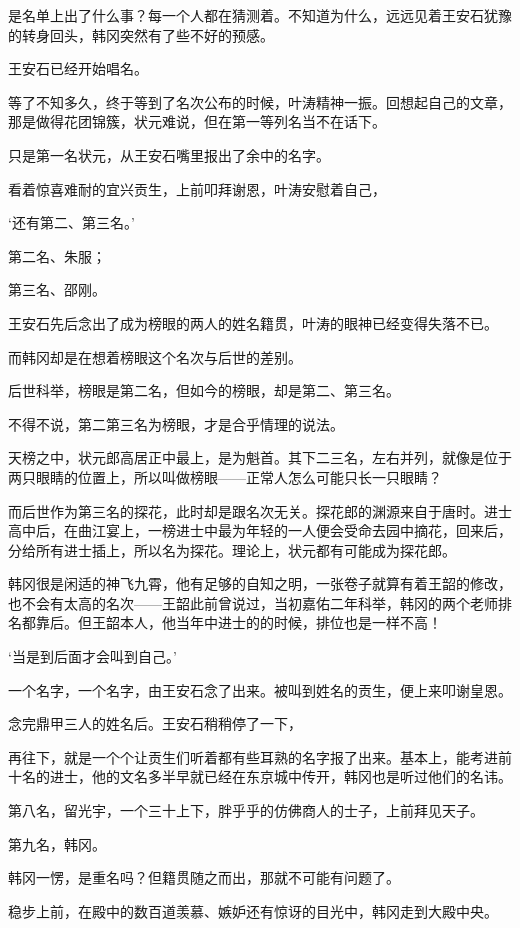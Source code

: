 是名单上出了什么事？每一个人都在猜测着。不知道为什么，远远见着王安石犹豫的转身回头，韩冈突然有了些不好的预感。

王安石已经开始唱名。

等了不知多久，终于等到了名次公布的时候，叶涛精神一振。回想起自己的文章，那是做得花团锦簇，状元难说，但在第一等列名当不在话下。

只是第一名状元，从王安石嘴里报出了余中的名字。

看着惊喜难耐的宜兴贡生，上前叩拜谢恩，叶涛安慰着自己，

‘还有第二、第三名。’

第二名、朱服；

第三名、邵刚。

王安石先后念出了成为榜眼的两人的姓名籍贯，叶涛的眼神已经变得失落不已。

而韩冈却是在想着榜眼这个名次与后世的差别。

后世科举，榜眼是第二名，但如今的榜眼，却是第二、第三名。

不得不说，第二第三名为榜眼，才是合乎情理的说法。

天榜之中，状元郎高居正中最上，是为魁首。其下二三名，左右并列，就像是位于两只眼睛的位置上，所以叫做榜眼——正常人怎么可能只长一只眼睛？

而后世作为第三名的探花，此时却是跟名次无关。探花郎的渊源来自于唐时。进士高中后，在曲江宴上，一榜进士中最为年轻的一人便会受命去园中摘花，回来后，分给所有进士插上，所以名为探花。理论上，状元都有可能成为探花郎。

韩冈很是闲适的神飞九霄，他有足够的自知之明，一张卷子就算有着王韶的修改，也不会有太高的名次——王韶此前曾说过，当初嘉佑二年科举，韩冈的两个老师排名都靠后。但王韶本人，他当年中进士的的时候，排位也是一样不高！

‘当是到后面才会叫到自己。’

一个名字，一个名字，由王安石念了出来。被叫到姓名的贡生，便上来叩谢皇恩。

念完鼎甲三人的姓名后。王安石稍稍停了一下，

再往下，就是一个个让贡生们听着都有些耳熟的名字报了出来。基本上，能考进前十名的进士，他的文名多半早就已经在东京城中传开，韩冈也是听过他们的名讳。

第八名，留光宇，一个三十上下，胖乎乎的仿佛商人的士子，上前拜见天子。

第九名，韩冈。

韩冈一愣，是重名吗？但籍贯随之而出，那就不可能有问题了。

稳步上前，在殿中的数百道羡慕、嫉妒还有惊讶的目光中，韩冈走到大殿中央。

